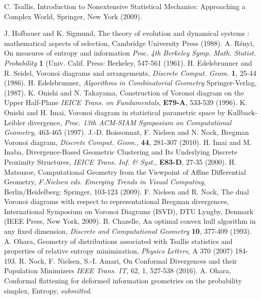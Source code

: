 \documentclass{llncs}
\begin{document}
\begin{thebibliography}{5}
C. Tsallis, 
Introduction to Nonextensive Statistical Mechanics: 
Approaching a Complex World, Springer, New York (2009).

 J. Hofbauer and K. Sigmund,
		The theory of evolution and dynamical systems : 
		mathematical aspects of selection, 
		Cambridge University Press (1988).
 A. R\'enyi,
		On measures of entropy and information 
		{\it Proc. 4th Berkeley Symp. Math. Statist. Probability}
		{\bf 1} (Univ. Calif. Press: Berkeley, 547-561 (1961).
	H. Edelsbrunner and R. Seidel,
		Voronoi diagrams and arrangements,
		{\it Discrete Comput. Geom.} {\bf 1}, 25-44 (1986).
	H. Edelsbrunner,
		{\it Algorithms in Combinatorial Geometry}
		Springer-Verlag, (1987).
	K. Onishi and N. Takayama,
		Construction of Voronoi diagram on the Upper Half-Plane
		{\it IEICE Trans. on Fundamentals}, {\bf E79-A}, 
		533-539 (1996).
	K. Onishi and H. Imai,
		Voronoi diagram in statistical parametric space by 
		Kullback-Leibler divergence,
		{\it Proc. 13th ACM-SIAM Symposium on Computational Geometry}, 
		 463-465 (1997).
	J.-D. Boissonnat, F. Nielsen and N. Nock,
		Bregman Voronoi diagram,
		{\it Discrete Comput. Geom.}, {\bf 44}, 281-307 (2010). 
	H. Imai and M. Inaba,
		Divergence-Based Geometric Clustering and Its Underlying 
		Discrete Proximity Structures,
		{\it IEICE Trans. Inf. \& Syst.}, {\bf E83-D}, 27-35 (2000).
 H. Matsuzoe,
		Computational Geometry from the Viewpoint of Affine 
		Differential Geometry,
		{\it F.Nielsen eds. Emerging Trends in Visual Computing}, 
		Berlin/Heidelberg: Springer, 103-123 (2009).
	F. Nielsen and R. Nock,
		The dual Voronoi diagrams with respect to representational 
		Bregman divergences,
		International Symposium on Voronoi Diagrams (ISVD), 
		DTU Lyngby, Denmark (IEEE Press, New York, 2009).
 B. Chazelle, 
		An optimal convex hull algorithm in any fixed dimension,
		{\it Discrete and Computational Geometry} {\bf 10}, 377-409 
		(1993).
 A. Ohara,
		Geometry of distributions associated with Tsallis statistics
		and properties of relative entropy minimization,
		{\it Physics Letters}, A 370 (2007) 184-193.
 R. Nock, F. Nielsen, S.-I. Amari,
		On Conformal Divergences and their Population Minimizers
		{\em IEEE Trans. IT}, 62, 1, 527-538 (2016).
 A. Ohara,
		Conformal flattening for deformed information geometries on 
		the probability simplex,
		Entropy, {\it submitted}.
\end{thebibliography}
\end{document}
